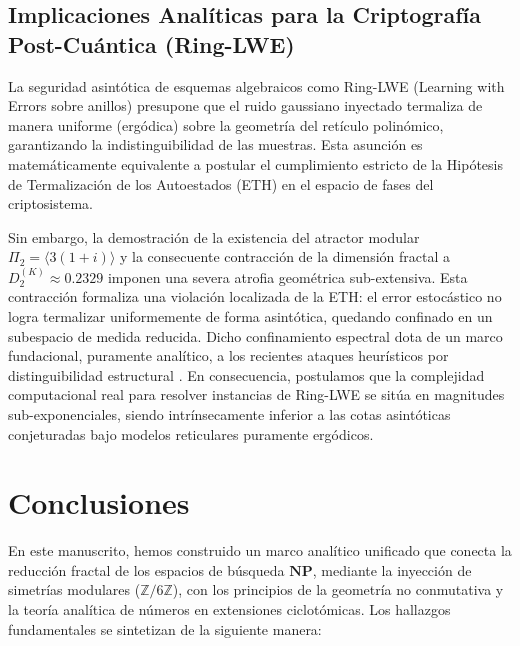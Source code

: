 \documentclass[sn-mathphys]{sn-jnl}
\theoremstyle{definition} %
\newcommand{\Zmod}{\mathbb{Z}/6\mathbb{Z}}
\begin{document}
\subsection{Implicaciones Analíticas para la Criptografía Post-Cuántica (Ring-LWE)}
La seguridad asintótica de esquemas algebraicos como Ring-LWE (Learning with Errors sobre anillos) presupone que el ruido gaussiano inyectado termaliza de manera uniforme (ergódica) sobre la geometría del retículo polinómico, garantizando la indistinguibilidad de las muestras. Esta asunción es matemáticamente equivalente a postular el cumplimiento estricto de la Hipótesis de Termalización de los Autoestados (ETH) en el espacio de fases del criptosistema.

Sin embargo, la demostración de la existencia del atractor modular $\Pi_2 = \langle 3(1+i) \rangle$ y la consecuente contracción de la dimensión fractal a $D_2^{(K)} \approx 0.2329$ imponen una severa atrofia geométrica sub-extensiva. Esta contracción formaliza una violación localizada de la ETH: el error estocástico no logra termalizar uniformemente de forma asintótica, quedando confinado en un subespacio de medida reducida. Dicho confinamiento espectral dota de un marco fundacional, puramente analítico, a los recientes ataques heurísticos por distinguibilidad estructural \cite{Wenger2024}. En consecuencia, postulamos que la complejidad computacional real para resolver instancias de Ring-LWE se sitúa en magnitudes sub-exponenciales, siendo intrínsecamente inferior a las cotas asintóticas conjeturadas bajo modelos reticulares puramente ergódicos.

\section{Conclusiones}

En este manuscrito, hemos construido un marco analítico unificado que conecta la reducción fractal de los espacios de búsqueda $\mathbf{NP}$, mediante la inyección de simetrías modulares ($\Zmod$), con los principios de la geometría no conmutativa y la teoría analítica de números en extensiones ciclotómicas. Los hallazgos fundamentales se sintetizan de la siguiente manera:
\end{document}

